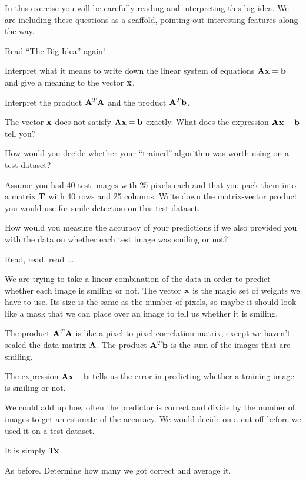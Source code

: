 \begin{prob}
In this exercise you will be carefully reading and interpreting this big idea. We are including these questions as a scaffold, pointing out interesting features along the way.
\be
\item Read ``The Big Idea'' again! 
\item Interpret what it means to write down the linear system of equations $\mathbf{A} \mathbf{x} = \mathbf{b}$ and give a meaning to the vector $\mathbf{x}$.
\item Interpret the product $\mathbf{A}^T \mathbf{A}$ and the product $\mathbf{A}^T \mathbf{b}$.
\item The vector $\mathbf{x}$ does not satisfy $\mathbf{A} \mathbf{x} = \mathbf{b}$ exactly. What does the expression $\mathbf{A} \mathbf{x}-\mathbf{b}$ tell you?
\item How would you decide whether your ``trained'' algorithm was worth using on a test dataset?
\item Assume you had 40 test images with 25 pixels each and that you pack them into a matrix $\mathbf{T}$ with 40 rows and 25 columns. Write down the matrix-vector product you would use for smile detection on this test dataset.
\item How would you measure the accuracy of your predictions if we also provided you with the data on whether each test image was smiling or not?
\ee
\end{prob}
\begin{sol}
\be
\item Read, read, read ....
\item We are trying to take a linear combination of the data in order to predict whether each image is smiling or not. The vector $\mathbf{x}$ is the magic set of weights we have to use. Its size is the same as the number of pixels, so maybe it should look like a mask that we can place over an image to tell us whether it is smiling.
\item The product $\mathbf{A}^T\mathbf{A}$ is like a pixel to pixel correlation matrix, except we haven't scaled the data matrix $\mathbf{A}$. The product $\mathbf{A}^T \mathbf{b}$ is the sum of the images that are smiling.
\item The expression $\mathbf{A} \mathbf{x} - \mathbf{b}$ tells us the error in predicting whether a training image is smiling or not.
\item We could add up how often the predictor is correct and divide by the number of images to get an estimate of the accuracy. We would decide on a cut-off before we used it on a test dataset.
\item It is simply $\mathbf{T} \mathbf{x}$.
\item As before. Determine how many we got correct and average it.
\ee
\end{sol}

